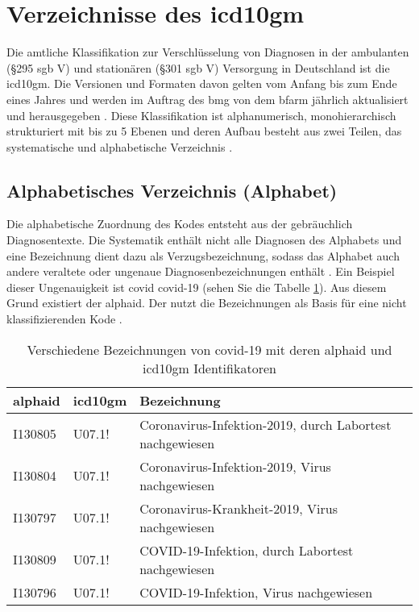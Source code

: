 \section{Verzeichnisse des \acs{icd10gm}}

Die amtliche Klassifikation zur Verschlüsselung von Diagnosen in der ambulanten (\S 295 \ac{sgb} V) und stationären (\S 301 \ac{sgb} V) Versorgung in Deutschland ist die \ac{icd10gm}. Die Versionen und Formaten davon gelten vom Anfang bis zum Ende eines Jahres und werden im Auftrag des \ac{bmg} von dem \ac{bfarm} jährlich aktualisiert und herausgegeben \cite{icd10}. Diese Klassifikation ist
alphanumerisch, monohierarchisch strukturiert mit bis zu 5 Ebenen und deren Aufbau besteht aus zwei Teilen, das systematische und alphabetische Verzeichnis \cite{icd10}.

\subsection{Alphabetisches Verzeichnis (Alphabet)} \label{alphadir}

Die alphabetische Zuordnung des Kodes entsteht aus der gebräuchlich Diagnosentexte. Die Systematik enthält nicht alle Diagnosen des Alphabets und eine Bezeichnung dient dazu als Verzugsbezeichnung, sodass das Alphabet auch andere veraltete oder ungenaue Diagnosenbezeichnungen enthält \cite{icd10alpha}. Ein Beispiel dieser Ungenauigkeit ist \textsf{\acl{covid}} \acs{covid}-19 (sehen Sie die Tabelle \ref{tab:difbe}). Aus diesem Grund existiert der \ac{alphaid}. Der nutzt die Bezeichnungen als Basis für eine nicht klassifizierenden Kode \cite{icd10alpha}.

\begin{table}[ht]
	\centering
	\small
	\caption[Verschiedene Bezeichnungen von COVID-19]{Verschiedene Bezeichnungen von \ac{covid}-19 mit deren \ac{alphaid} und \ac{icd10gm} Identifikatoren}
	\label{tab:difbe}
	\begin{tabular}{|l|l|l|}
		\hline
		\rowcolor{lightgray} \ac{alphaid} & \ac{icd10gm} & Bezeichnung \\
		\hline
		I130805 & U07.1! & Coronavirus-Infektion-2019, durch Labortest nachgewiesen \\ \hline
		I130804 & U07.1! & Coronavirus-Infektion-2019, Virus nachgewiesen \\ \hline
		I130797 & U07.1! & Coronavirus-Krankheit-2019, Virus nachgewiesen \\ \hline
		I130809 & U07.1! & COVID-19-Infektion, durch Labortest nachgewiesen \\ \hline
		I130796 & U07.1! & COVID-19-Infektion, Virus nachgewiesen \\ \hline				
	\end{tabular}
\end{table}

